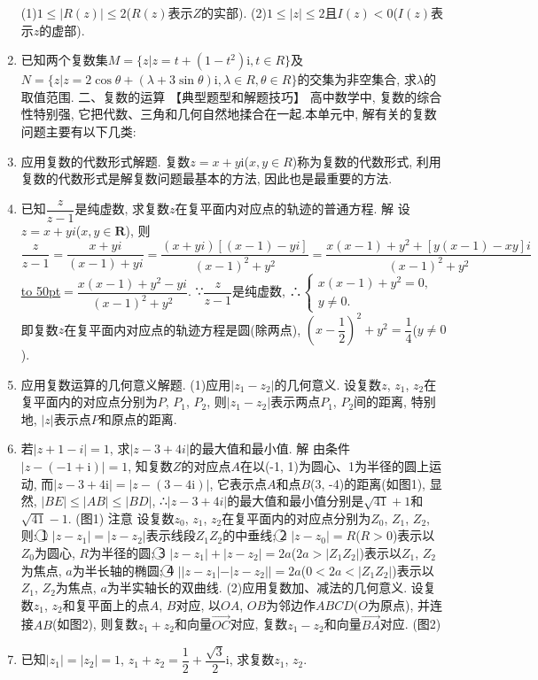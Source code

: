 \documentclass[10pt,a4paper]{article}
\newcommand{\blank}[1]{\underline{\hbox to #1pt{}}}
\begin{document}
\begin{enumerate}[1.]
(1)$1\le|R(z)|\le 2$($R(z)$表示$Z$的实部).
(2)$1\le|z|\le 2$且$I(z)<0$($I(z)$表示$z$的虚部).
\item 已知两个复数集$M=\{z|z=t+(1-t^2)\mathrm{i},t\in R\}$及$N=\{z|z=2\cos \theta +(\lambda +3\sin \theta)\mathrm{i},\lambda \in R,\theta \in R\}$的交集为非空集合, 求$\lambda$的取值范围.
二、复数的运算
【典型题型和解题技巧】
高中数学中, 复数的综合性特别强, 它把代数、三角和几何自然地揉合在一起.本单元中, 解有关的复数问题主要有以下几类:
\item 应用复数的代数形式解题.
复数$z=x+y\mathrm{i}$($x,y\in R$)称为复数的代数形式, 利用复数的代数形式是解复数问题最基本的方法, 因此也是最重要的方法.
\item 已知$\dfrac z{z-1}$是纯虚数, 求复数$z$在复平面内对应点的轨迹的普通方程.
解  设$z=x+yi$($x,y\in \mathbf{R}$),
则$\dfrac z{z-1}=\dfrac{x+yi}{(x-1)+yi}=\dfrac{(x+yi)[(x-1)-yi]}{{{(x-1)}^2}+{y^2}}=\dfrac{x(x-1)+{y^2}+[y(x-1)-xy]i}{{{(x-1)}^2}+{y^2}}$
\blank{50}$=\dfrac{x(x-1)+{y^2}-yi}{{{(x-1)}^2}+{y^2}}$.
∵$\dfrac z{z-1}$是纯虚数, ∴$\begin{cases} x(x-1)+y^2=0, \\ y\ne 0. \end{cases}$
即复数$z$在复平面内对应点的轨迹方程是圆(除两点), $(x-\dfrac 12)^2+y^2=\dfrac 14$($y\ne 0$).
\item 应用复数运算的几何意义解题.
(1)应用$|z_1-z_2|$的几何意义.
设复数$z$, $z_1$, $z_2$在复平面内的对应点分别为$P$, $P_1$, $P_2$, 则$|z_1-z_2|$表示两点$P_1$, $P_2$间的距离, 特别地, $|z|$表示点$P$和原点的距离.
\item 若$|z+1-i|=1$, 求$|z-3+4i|$的最大值和最小值.
解  由条件$|z-(-1+\mathrm{i})|=1$, 知复数$Z$的对应点$A$在以(-1, 1)为圆心、1为半径的圆上运动, 而$|z-3+4\mathrm{i}|=|z-(3-4\mathrm{i})|$, 它表示点$A$和点$B$(3, -4)的距离(如图1), 显然, $|BE|\le|AB|\le|BD|$,
∴$|z-3+4i|$的最大值和最小值分别是$\sqrt {41}+1$和$\sqrt {41}-1$.
(图1)
注意  设复数$z_0$, $z_1$, $z_2$在复平面内的对应点分别为$Z_0$, $Z_1$, $Z_2$, 则:
\textcircled{1} $|z-z_1|=|z-z_2|$表示线段$Z_1Z_2$的中垂线;
\textcircled{2} $|z-z_0|=R$($R>0$)表示以$Z_0$为圆心, $R$为半径的圆;
\textcircled{3} $|z-z_1|+|z-z_2|=2a$($2a>|Z_1Z_2|$)表示以$Z_1$, $Z_2$为焦点, $a$为半长轴的椭圆;
\textcircled{4} $||z-z_1|-|z-z_2||=2a$($0<2a<|Z_1Z_2|$)表示以$Z_1$, $Z_2$为焦点, $a$为半实轴长的双曲线.
(2)应用复数加、减法的几何意义.
设复数$z_1$, $z_2$和复平面上的点$A$, $B$对应, 以$OA$, $OB$为邻边作$ABCD$($O$为原点), 并连接$AB$(如图2), 则复数$z_1+z_2$和向量$\overrightarrow{OC}$对应, 复数$z_1-z_2$和向量$\overrightarrow{BA}$对应.
(图2)
\item 已知$|z_1|=|z_2|=1$, $z_1+z_2=\dfrac 12+\dfrac{\sqrt 3}2\mathrm{i}$, 求复数$z_1$, $z_2$.

\end{enumerate}
\end{document}
